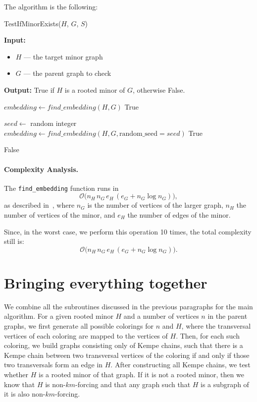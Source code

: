 The algorithm is the following:
\begin{algorithm}[H]
    \caption{TestIfMinorExists($H$, $G$, $S$)}
    \begin{algorithmic}[1]
        \Statex \textbf{Input:} 
        \begin{itemize}
            \item \( H \) — the target minor graph
            \item \( G \) — the parent graph to check
        \end{itemize}
        \Statex \textbf{Output:} True if $H$ is a rooted minor of $G$, otherwise False.

        \State $embedding \gets {find\_embedding}(H, G)$
            \State \Return True
        \EndIf

            \State $seed \gets$ random integer
            \State $embedding \gets {find\_embedding}(H, G, \text{random\_seed} = seed)$
                \State \Return True
            \EndIf
        \EndFor

        \State \Return False
    \end{algorithmic}
\end{algorithm}

\paragraph{Complexity Analysis.}

The \texttt{find\_embedding} function runs in
\[
  \mathcal{O}\bigl(n_H\,n_G\,e_H\,(e_G + n_G \log n_G)\bigr),
\]
as described in~\cite{cai2014practicalheuristicfindinggraph}, where $n_G$ is the number of vertices of the larger graph, $n_H$ the number of vertices of the minor, and $e_H$ the number of edges of the minor.

Since, in the worst case, we perform this operation 10 times, the total complexity still is:
\[
  \mathcal{O}\bigl(n_H\,n_G\,e_H\,(e_G + n_G \log n_G)\bigr).
\]

\section{Bringing everything together}
\label{main:algo:section}

We combine all the subroutines discussed in the previous paragraphs for the main algorithm. For a given rooted minor  
$H$ and a number of vertices $n$ in the parent graphs, we first generate all possible colorings for $n$ and $H$, where  
the transversal vertices of each coloring are mapped to the vertices of $H$. Then, for each such coloring, we build graphs consisting only  
of Kempe chains, such that there is a Kempe chain between two transversal vertices of the coloring if and only if those two transversals  
form an edge in $H$. After constructing all Kempe chains, we test whether $H$ is a rooted minor of that graph. If it is not a  
rooted minor, then we know that $H$ is non-$km$-forcing and that any graph such that $H$ is a subgraph of it is also non-$km$-forcing.

